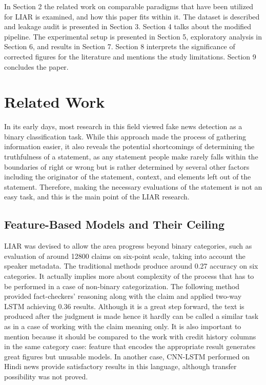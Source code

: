 In Section 2 the related work on comparable paradigms that have been utilized for LIAR is examined, and how this paper fits within it. The dataset is described and leakage audit is presented in Section 3. Section 4 talks about the modified pipeline. The experimental setup is presented in Section 5, exploratory analysis in Section 6, and results in Section 7. Section 8 interprets the significance of corrected figures for the literature and mentions the study limitations. Section 9 concludes the paper.

\section{Related Work}

In its early days, most research in this field viewed fake news detection as a binary classification task. While this approach made the process of gathering information easier, it also reveals the potential shortcomings of determining the truthfulness of a statement, as any statement people make rarely falls within the boundaries of right or wrong but is rather determined by several other factors including the originator of the statement, context, and elements left out of the statement. Therefore, making the necessary evaluations of the statement is not an easy task, and this is the main point of the LIAR research.

\subsection{Feature-Based Models and Their Ceiling}

LIAR was devised to allow the area progress beyond binary categories, such as evaluation of around 12800 claims on six-point scale, taking into account the speaker metadata. The traditional methods produce around 0.27 accuracy on six categories. It actually implies more about complexity of the process that has to be performed in a case of non-binary categorization. The following method provided fact-checkers' reasoning along with the claim and applied two-way LSTM achieving 0.36 results. Although it is a great step forward, the text is produced after the judgment is made hence it hardly can be called a similar task as in a case of working with the claim meaning only. It is also important to mention because it should be compared to the work with credit history columns in the same category case: feature that encodes the appropriate result generates great figures but unusable models. In another case, CNN-LSTM performed on Hindi news provide satisfactory results in this language, although transfer possibility was not proved.

